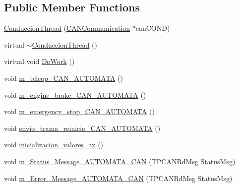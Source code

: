 \subsection*{\-Public \-Member \-Functions}
\begin{DoxyCompactItemize}
\item 
\hyperlink{class_conduccion_thread_af4208860e61866c8aebd86a58f99f83e}{\-Conduccion\-Thread} (\hyperlink{class_c_a_n_communication}{\-C\-A\-N\-Communication} $\ast$can\-C\-O\-N\-D)
\item 
virtual \hyperlink{class_conduccion_thread_af18549f4e72097c5c82a13975396423a}{$\sim$\-Conduccion\-Thread} ()
\item 
virtual void \hyperlink{class_conduccion_thread_a4267de3c2e18e8b2c3e56cd8e8edfa77}{\-Do\-Work} ()
\item 
void \hyperlink{class_conduccion_thread_ada8b449805f320d94841224eee0cdce5}{m\-\_\-teleop\-\_\-\-C\-A\-N\-\_\-\-A\-U\-T\-O\-M\-A\-T\-A} ()
\item 
void \hyperlink{class_conduccion_thread_a644e33e7220de02cec522de1fa9d3adb}{m\-\_\-engine\-\_\-brake\-\_\-\-C\-A\-N\-\_\-\-A\-U\-T\-O\-M\-A\-T\-A} ()
\item 
void \hyperlink{class_conduccion_thread_ad0a03718e4e843801ff9133763df3020}{m\-\_\-emergency\-\_\-stop\-\_\-\-C\-A\-N\-\_\-\-A\-U\-T\-O\-M\-A\-T\-A} ()
\item 
void \hyperlink{class_conduccion_thread_afa3bfdecad32e8498ed537b01042aff2}{envio\-\_\-trama\-\_\-reinicio\-\_\-\-C\-A\-N\-\_\-\-A\-U\-T\-O\-M\-A\-T\-A} ()
\item 
void \hyperlink{class_conduccion_thread_a291eb5c1d53b449f445db2673d421745}{inicializacion\-\_\-valores\-\_\-tx} ()
\item 
void \hyperlink{class_conduccion_thread_a5a6b4ac4bb02c365951316d4ff881f0c}{m\-\_\-\-Status\-\_\-\-Message\-\_\-\-A\-U\-T\-O\-M\-A\-T\-A\-\_\-\-C\-A\-N} (\-T\-P\-C\-A\-N\-Rd\-Msg \-Status\-Msg)
\item 
void \hyperlink{class_conduccion_thread_abebb162804ed8480b52266fa2e8c1130}{m\-\_\-\-Error\-\_\-\-Message\-\_\-\-A\-U\-T\-O\-M\-A\-T\-A\-\_\-\-C\-A\-N} (\-T\-P\-C\-A\-N\-Rd\-Msg \-Status\-Msg)
\end{DoxyCompactItemize}
